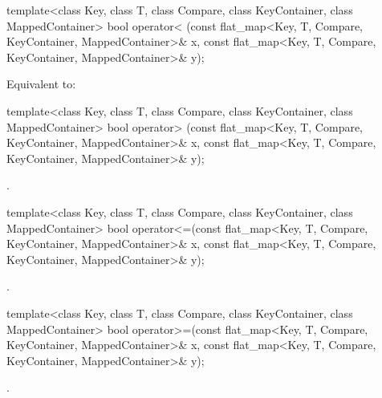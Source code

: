 \begin{codeblock}
\begin{codeblock}
\begin{codeblock}
\begin{addedblock}
%
\begin{itemdecl}
template<class Key, class T, class Compare, class KeyContainer, class MappedContainer>
  bool operator< (const flat_map<Key, T, Compare, KeyContainer, MappedContainer>& x,
                  const flat_map<Key, T, Compare, KeyContainer, MappedContainer>& y);
\end{itemdecl}

\begin{itemdescr}
\pnum
\effects Equivalent to:
\end{itemdescr}

%
\begin{itemdecl}
template<class Key, class T, class Compare, class KeyContainer, class MappedContainer>
  bool operator> (const flat_map<Key, T, Compare, KeyContainer, MappedContainer>& x,
                  const flat_map<Key, T, Compare, KeyContainer, MappedContainer>& y);
\end{itemdecl}

\begin{itemdescr}
\pnum \returns {}.
\end{itemdescr}

%
\begin{itemdecl}
template<class Key, class T, class Compare, class KeyContainer, class MappedContainer>
  bool operator<=(const flat_map<Key, T, Compare, KeyContainer, MappedContainer>& x,
                  const flat_map<Key, T, Compare, KeyContainer, MappedContainer>& y);
\end{itemdecl}

\begin{itemdescr}
\pnum \returns {}.
\end{itemdescr}

%
\begin{itemdecl}
template<class Key, class T, class Compare, class KeyContainer, class MappedContainer>
  bool operator>=(const flat_map<Key, T, Compare, KeyContainer, MappedContainer>& x,
                  const flat_map<Key, T, Compare, KeyContainer, MappedContainer>& y);
\end{itemdecl}

\begin{itemdescr}
\pnum \returns {}.
\end{itemdescr}


\end{addedblock}
\end{codeblock}
\end{codeblock}
\end{codeblock}
